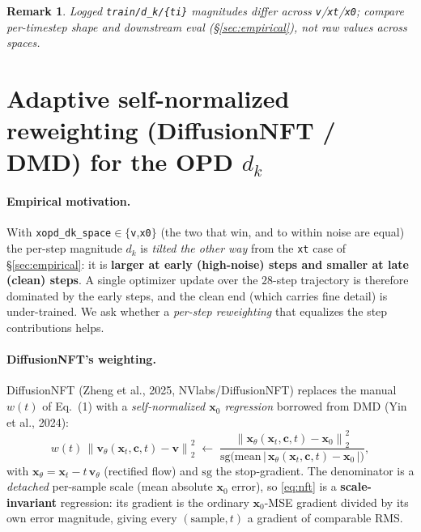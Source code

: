 \documentclass[11pt,a4paper]{article}
\newcommand{\norm}[1]{\left\lVert #1 \right\rVert}
\newcommand{\dk}{d_k}
\newtheorem*{remark*}{Remark}
\begin{document}
\begin{remark*}
Logged \texttt{train/d\_k/\{ti\}} magnitudes differ across \texttt{v}/\texttt{xt}/\texttt{x0}; compare
per-timestep \emph{shape} and downstream eval (\S\ref{sec:empirical}), not raw values across spaces.
\end{remark*}

\section{Adaptive self-normalized reweighting (DiffusionNFT / DMD) for the OPD $d_k$}
\label{sec:selfnorm}

\paragraph{Empirical motivation.} With \texttt{xopd\_dk\_space}$\in\{$\texttt{v},\texttt{x0}$\}$ (the two
that win, and to within noise are equal) the per-step magnitude $\dk$ is \emph{tilted the other way}
from the \texttt{xt} case of \S\ref{sec:empirical}: it is \textbf{larger at early (high-noise) steps and
smaller at late (clean) steps}. A single optimizer update over the $28$-step trajectory is therefore
dominated by the early steps, and the clean end (which carries fine detail) is under-trained. We ask
whether a \emph{per-step reweighting} that equalizes the step contributions helps.

\paragraph{DiffusionNFT's weighting.} DiffusionNFT (Zheng et al., 2025, NVlabs/DiffusionNFT) replaces
the manual $w(t)$ of Eq.~(1) with a \emph{self-normalized $\bm{x}_0$ regression} borrowed from DMD
(Yin et al., 2024):
\begin{equation}\label{eq:nft}
  w(t)\,\norm{\bm{v}_\theta(\bm{x}_t,\bm{c},t)-\bm{v}}_2^2
  \;\longleftarrow\;
  \frac{\norm{\bm{x}_\theta(\bm{x}_t,\bm{c},t)-\bm{x}_0}_2^2}
       {\mathrm{sg}\!\big(\mathrm{mean}\,|\,\bm{x}_\theta(\bm{x}_t,\bm{c},t)-\bm{x}_0\,|\big)},
\end{equation}
with $\bm{x}_\theta=\bm{x}_t-t\,\bm{v}_\theta$ (rectified flow) and $\mathrm{sg}$ the stop-gradient. The
denominator is a \emph{detached} per-sample scale (mean absolute $\bm{x}_0$ error), so \eqref{eq:nft} is
a \textbf{scale-invariant} regression: its gradient is the ordinary $\bm{x}_0$-MSE gradient divided by
its own error magnitude, giving every $(\text{sample},t)$ a gradient of comparable RMS.
\end{document}

